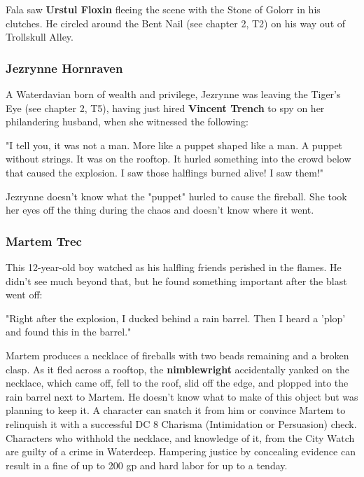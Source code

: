 \documentclass[10pt,a4paper,twoside,twocolumn,openany,nodeprecatedcode]{dndbook}
\begin{document}
Fala saw \textbf{Urstul Floxin} fleeing the scene with the Stone of Golorr in his clutches. He circled around the Bent Nail (see chapter 2, T2) on his way out of Trollskull Alley.
\subsubsection{Jezrynne Hornraven}
A Waterdavian born of wealth and privilege, Jezrynne was leaving the Tiger's Eye (see chapter 2, T5), having just hired \textbf{Vincent Trench} to spy on her philandering husband, when she witnessed the following:
\begin{DndReadAloud}{}
"I tell you, it was not a man. More like a puppet shaped like a man. A puppet without strings. It was on the rooftop. It hurled something into the crowd below that caused the explosion. I saw those halflings burned alive! I saw them!"
\end{DndReadAloud}

Jezrynne doesn't know what the "puppet" hurled to cause the fireball. She took her eyes off the thing during the chaos and doesn't know where it went.
\subsubsection{Martem Trec}
This 12-year-old boy watched as his halfling friends perished in the flames. He didn't see much beyond that, but he found something important after the blast went off:
\begin{DndReadAloud}{}
"Right after the explosion, I ducked behind a rain barrel. Then I heard a 'plop' and found this in the barrel."
\end{DndReadAloud}

Martem produces a necklace of fireballs with two beads remaining and a broken clasp. As it fled across a rooftop, the \textbf{nimblewright} accidentally yanked on the necklace, which came off, fell to the roof, slid off the edge, and plopped into the rain barrel next to Martem.
He doesn't know what to make of this object but was planning to keep it. A character can snatch it from him or convince Martem to relinquish it with a successful DC 8 Charisma (Intimidation or Persuasion) check.
Characters who withhold the necklace, and knowledge of it, from the City Watch are guilty of a crime in Waterdeep. Hampering justice by concealing evidence can result in a fine of up to 200 gp and hard labor for up to a tenday.
\end{document}
